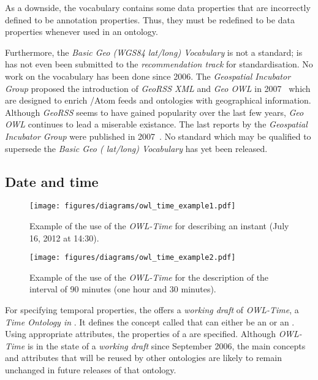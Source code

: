 As a downside, the vocabulary contains some data properties that are incorrectly defined to be annotation properties. Thus, they must be redefined to be data properties whenever used in an  ontology.

Furthermore, the \emph{Basic Geo (WGS84 lat/long) Vocabulary} is not a standard; is has not even been submitted to the \emph{ recommendation track} for standardisation. No work on the vocabulary has been done since 2006. The \emph{ Geospatial Incubator Group} proposed the introduction of \emph{GeoRSS XML} and \emph{Geo OWL} in 2007~\cite{w3c_geo_report1} which are designed to enrich /Atom feeds and  ontologies with geographical information. Although \emph{GeoRSS} seems to have gained popularity over the last few years, \emph{Geo OWL} continues to lead a miserable existance. The last reports by the \emph{ Geospatial Incubator Group} were published in 2007~\cite{w3c_geo_report1,w3c_geo_report2}. No standard which may be qualified to supersede the \emph{Basic Geo ( lat/long) Vocabulary} has yet been released.

\subsection{Date and time}
\label{subsec:date_ontologies}

\begin{figure}
\centering
\texttt{[image: figures/diagrams/owl\_time\_example1.pdf]}
\caption{Example of the use of the \emph{OWL-Time} for describing an instant (July 16, 2012 at 14:30).}
\label{fig:owl_time_example1}
\end{figure}

\begin{figure}
\centering
\texttt{[image: figures/diagrams/owl\_time\_example2.pdf]}
\caption{Example of the use of the \emph{OWL-Time} for the description of the interval of 90 minutes (one hour and 30 minutes).}
\label{fig:owl_time_example2}
\end{figure}

For specifying temporal properties, the  offers a \emph{working draft} of \emph{OWL-Time}\cite{owl-time}, a \emph{Time Ontology in }. It defines the concept called  that can either be an  or an . Using appropriate attributes, the properties of a  are specified. Although \emph{OWL-Time} is in the state of a \emph{working draft} since September 2006, the main concepts and attributes that will be reused by other ontologies are likely to remain unchanged in future releases of that ontology.

